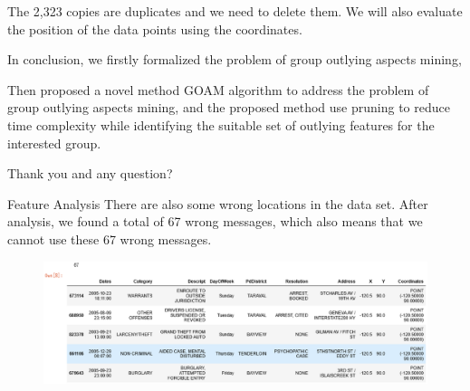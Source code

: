 \documentclass[
 size=14pt,
 paper=smartboard,  %
 mode=present, 		%
 display=slides, 	%
 style=tuliplab,  	%
 pauseslide,
 fleqn,leqno]{powerdot}
\begin{document}
\begin{slide}[toc=,bm=]{}
The 2,323 copies are duplicates and we need to delete them.
We will also evaluate the position of the data points using the coordinates.
\begin{note}
In conclusion,
we firstly formalized the problem of
group outlying aspects mining,

Then proposed a novel method GOAM algorithm to address the problem of
group outlying aspects mining,
and the proposed method use pruning to reduce time complexity
while identifying the suitable set of outlying features for the interested group.

Thank you and any question?
\end{note}

\end{slide}

\begin{slide}{Feature Analysis}
  There are also some wrong locations in the data set. After analysis, we 
  found a total of 67 wrong messages, which also means that we cannot use
   these 67 wrong messages.
  \begin{figure}
    \centering
    \includegraphics[width=1\textwidth]{kaggle/6.1.eps}
  \end{figure}


\end{slide}



\end{document}
